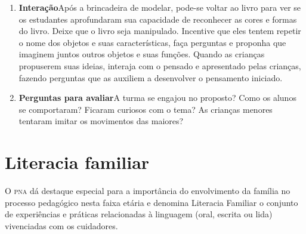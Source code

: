 \documentclass[11pt]{extarticle}
\begin{document}
\begin{enumerate}

\item \textbf{Interação}\quad Após a brincadeira de modelar, pode-se voltar ao livro para ver se os estudantes aprofundaram sua capacidade de reconhecer as cores e formas do livro.
Deixe que o livro seja manipulado. Incentive que eles tentem repetir o nome dos objetos e suas características,
faça perguntas e proponha que imaginem juntos outros objetos e suas funções.
Quando as crianças propuserem suas ideias, interaja com o pensado e apresentado pelas crianças, fazendo perguntas que as auxiliem a desenvolver o pensamento iniciado.

\item \textbf{Perguntas para avaliar}\quad A turma se engajou no proposto? Como os alunos se comportaram? Ficaram curiosos com o tema? As crianças menores tentaram imitar os movimentos das maiores? 
\end{enumerate}


\section{Literacia familiar}
O \textsc{pna} dá destaque especial para a importância do envolvimento da família 
no processo pedagógico nesta faixa etária e denomina Literacia Familiar o conjunto 
de experiências e práticas relacionadas à linguagem (oral, escrita ou lida) vivenciadas 
com os cuidadores. 
\end{document}
